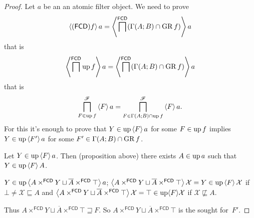 \begin{proof}
Let $a$ be an an atomic filter object. We need to prove 
\[
\left\langle (\mathsf{FCD}) f\right\rangle a=\left\langle \bigsqcap^{\mathsf{FCD}}(\Gamma(A;B)\cap\operatorname{GR} f)\right\rangle a
\]
that is 
\[
\left\langle \bigsqcap^{\mathsf{FCD}}\operatorname{up} f\right\rangle a=\left\langle \bigsqcap^{\mathsf{FCD}}(\Gamma(A;B)\cap\operatorname{GR} f)\right\rangle a
\]
that is 
\[
\bigsqcap_{F\in\operatorname{up} f}^{\mathscr{F}}\left\langle F\right\rangle a=\bigsqcap_{F\in\Gamma(A;B)\cap\operatorname{up} f}^{\mathscr{F}}\left\langle F\right\rangle a.
\]
For this it's enough to prove that $Y\in\operatorname{up}\left\langle F\right\rangle a$ for some $F\in\operatorname{up} f$
implies $Y\in\operatorname{up}\left\langle F'\right\rangle a$ for some $F'\in\Gamma(A;B)\cap\operatorname{GR} f$.

Let $Y\in\operatorname{up}\left\langle F\right\rangle a$. Then (proposition above) there exists $A\in\operatorname{up} a$
such that $Y\in\operatorname{up}\left\langle F\right\rangle A$.

$Y\in\operatorname{up}\left\langle A\times^{\mathsf{FCD}}Y\sqcup\overline{A}\times^{\mathsf{FCD}}\top\right\rangle a$;
$\left\langle A\times^{\mathsf{FCD}}Y\sqcup\overline{A}\times^{\mathsf{FCD}}\top\right\rangle\mathcal{X}=Y\in\operatorname{up}\left\langle F\right\rangle\mathcal{X}$
if $\bot\neq\mathcal{X}\sqsubseteq A$ and $\left\langle A\times^{\mathsf{FCD}}Y\sqcup\overline{A}\times^{\mathsf{FCD}}\top\right\rangle\mathcal{X}=\top\in\operatorname{up}\langle F\rangle\mathcal{X}$
if $\mathcal{X}\nsqsubseteq A$.

Thus $A\times^{\mathsf{FCD}}Y\sqcup\overline{A}\times^{\mathsf{FCD}}\top\sqsupseteq F$.
So $A\times^{\mathsf{FCD}}Y\sqcup\overline{A}\times^{\mathsf{FCD}}\top$
is the sought for~$F'$.
\end{proof}

